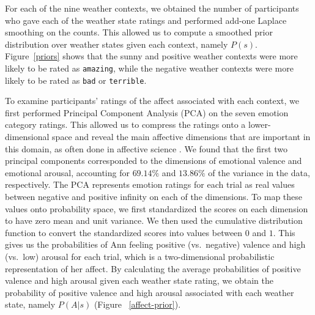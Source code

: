 \documentclass[10pt,letterpaper]{article}
\begin{document}
For each of the nine weather contexts, we obtained the number of participants who gave each of the weather state ratings and performed add-one Laplace smoothing on the counts. This allowed us to compute a smoothed prior distribution over weather states given each context, namely $P(s)$. Figure~\ref{priors} shows that the sunny and positive weather contexts were more likely to be rated as \texttt{amazing}, while the negative weather contexts were more likely to be rated as \texttt{bad} or \texttt{terrible}.  %

To examine participants' ratings of the affect associated with each context, we first performed Principal Component Analysis (PCA) on the seven emotion category ratings. This allowed us to compress the ratings onto a lower-dimensional space and reveal the main affective dimensions that are important in this domain, as often done in affective science \cite{russell1980circumplex}. We found that the first two principal components corresponded to the dimensions of emotional valence and emotional arousal, accounting for $69.14\%$ and $13.86\%$ of the variance in the data, respectively.
The PCA represents emotion ratings for each trial as real values between negative and positive infinity on each of the dimensions. To map these values onto probability space, we first standardized the scores on each dimension to have zero mean and unit variance. We then used the cumulative distribution function to convert the standardized scores into values between $0$ and $1$. 
This gives us the probabilities of Ann feeling positive (vs.~negative) valence and high (vs.~low) arousal for each trial, which is a two-dimensional probabilistic representation of her affect.
By calculating the average probabilities of positive valence and high arousal given each weather state rating, we obtain the probability of positive valence and high arousal associated with each weather state, namely $P(A | s)$ (Figure ~\ref{affect-prior}).
\end{document}
